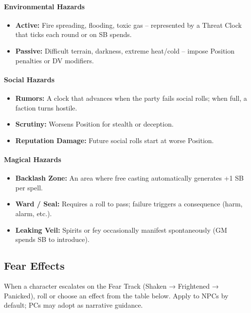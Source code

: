 \paragraph{Environmental Hazards}
\begin{itemize}
  \item \textbf{Active:} Fire spreading, flooding, toxic gas -- represented by a Threat Clock that ticks each round or on SB spends.
  \item \textbf{Passive:} Difficult terrain, darkness, extreme heat/cold -- impose Position penalties or DV modifiers.
\end{itemize}

\paragraph{Social Hazards}
\begin{itemize}
  \item \textbf{Rumors:} A clock that advances when the party fails social rolls; when full, a faction turns hostile.
  \item \textbf{Scrutiny:} Worsens Position for stealth or deception.
  \item \textbf{Reputation Damage:} Future social rolls start at worse Position.
\end{itemize}

\paragraph{Magical Hazards}
\begin{itemize}
  \item \textbf{Backlash Zone:} An area where free casting automatically generates +1 SB per spell.
  \item \textbf{Ward / Seal:} Requires a roll to pass; failure triggers a consequence (harm, alarm, etc.).
  \item \textbf{Leaking Veil:} Spirits or fey occasionally manifest spontaneously (GM spends SB to introduce).
\end{itemize}

\subsection{Fear Effects}
When a character escalates on the Fear Track (Shaken → Frightened → Panicked), roll or choose an effect from the table below. Apply to NPCs by default; PCs may adopt as narrative guidance.

